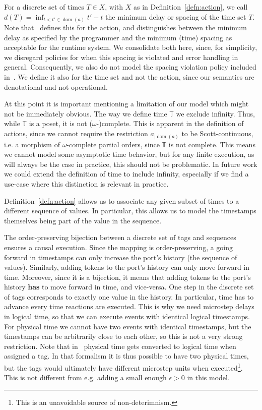 For a discrete set of times $T \in X$, with $X$ as in Definition~\ref{defn:action}, we call $d(T) = \operatorname{inf}_{t < t' \in \operatorname{dom}(a)} t' - t$ the minimum delay or spacing of the time set $T$. 
Note that~\cite{lohstroh_phdthesis} defines this for the action, and distinguishes between the minimum delay as specified by the programmer and the minimum (time) spacing as acceptable for the runtime system.
We consolidate both here, since, for simplicity, we disregard policies for when this spacing is violated and error handling in general.
Consequently, we also do not model the spacing violation policy included in~\cite{lohsroh_phdthesis}. 
We define it also for the time set and not the action, since our semantics are denotational and not operational.

At this point it is important mentioning a limitation of our model which might not be immediately obvious.
The way we define time $\mathbb{T}$ we exclude infinity. Thus, while $\mathbb{T}$ is a \ac{poset}, it is not ($\omega$-)complete.
This is apparent in the definition of actions, since we cannot require the restriction $a_{\big| \operatorname{dom}(a)}$ to be Scott-continuous, i.e. a morphism of $\omega$-complete partial orders, since $\mathbb{T}$ is not complete. 
This means we cannot model some asymptotic time behavior, but for any finite execution, as will always be the case in practice, this should not be problematic.
In future work we could extend the definition of time to include infinity, especially if we find a use-case where this distinction is relevant in practice.

Definition~\ref{defn:action} allows us to associate any given subset of times to a different sequence of values.
In particular, this allows us to model the timestamps themselves being part of the value in the sequence.

The order-preserving bijection between a discrete set of tags and sequences ensures a causal execution.
Since the mapping is order-preserving, a going forward in timestamps can only increase the port's history (the sequence of values).
Similarly, adding tokens to the port's history can only move forward in time. 
Moreover, since it is a bijection, it means that adding tokens to the port's history \textbf{has} to move forward in time, and vice-versa.
One step in the discrete set of tags corresponds to exactly one value in the history.
In particular, time has to advance every time reactions are executed. 
This is why we need microstep delays in logical time, so that we can execute events with identical logical timestamps.
For physical time we cannot have two events with identical timestamps, but the timestamps can be arbitrarily close to each other, so this is not a very strong restriction.
Note that in~\cite{lohstroh_phdthesis} physical time gets converted to logical time when assigned a tag. 
In that formalism it is thus possible to have two physical times, but the tags would ultimately have different microstep units when executed\footnote{This is an unavoidable source of non-deterimnism.}.
This is not different from e.g. adding a small enough $\epsilon > 0$ in this model.

